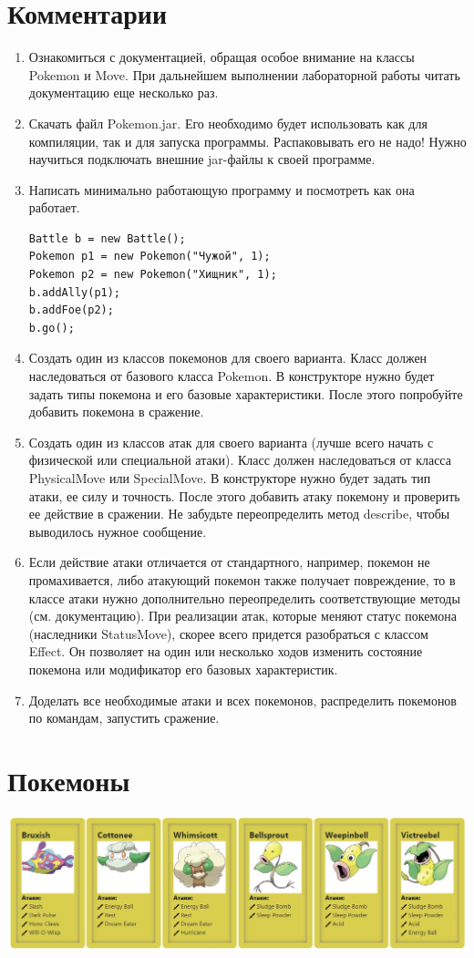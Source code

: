 \section*{Комментарии}
\begin{enumerate}
  \item Ознакомиться с документацией, обращая особое внимание на классы Pokemon и Move. При дальнейшем выполнении лабораторной работы читать документацию еще несколько раз.
  \item Скачать файл Pokemon.jar. Его необходимо будет использовать как для компиляции, так и для запуска программы. Распаковывать его не надо! Нужно научиться подключать внешние jar-файлы к своей программе.
  \item Написать минимально работающую программу и посмотреть как она работает.
        \begin{lstlisting}
Battle b = new Battle();
Pokemon p1 = new Pokemon("Чужой", 1);
Pokemon p2 = new Pokemon("Хищник", 1);
b.addAlly(p1);
b.addFoe(p2);
b.go();
\end{lstlisting}
  \item Создать один из классов покемонов для своего варианта. Класс должен наследоваться от базового класса Pokemon. В конструкторе нужно будет задать типы покемона и его базовые характеристики. После этого попробуйте добавить покемона в сражение.
  \item Создать один из классов атак для своего варианта (лучше всего начать с физической или специальной атаки). Класс должен наследоваться от класса PhysicalMove или SpecialMove. В конструкторе нужно будет задать тип атаки, ее силу и точность. После этого добавить атаку покемону и проверить ее действие в сражении. Не забудьте переопределить метод describe, чтобы выводилось нужное сообщение.
  \item Если действие атаки отличается от стандартного, например, покемон не промахивается, либо атакующий покемон также получает повреждение, то в классе атаки нужно дополнительно переопределить соответствующие методы (см. документацию). При реализации атак, которые меняют статус покемона (наследники StatusMove), скорее всего придется разобраться с классом Effect. Он позволяет на один или несколько ходов изменить состояние покемона или модификатор его базовых характеристик.
  \item Доделать все необходимые атаки и всех покемонов, распределить покемонов по командам, запустить сражение.
\end{enumerate}

\section*{Покемоны}
\begin{center}
  \includegraphics[scale=0.5]{pokemons.jpg}
\end{center}

